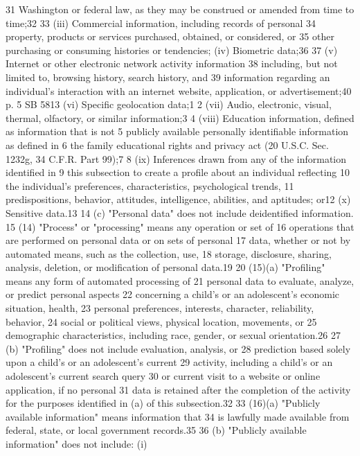 31 Washington or federal law, as they may be construed or amended from
time to time;32
33 (iii) Commercial information, including records of personal
34 property, products or services purchased, obtained, or considered, or
35 other purchasing or consuming histories or tendencies;
(iv) Biometric data;36
37 (v) Internet or other electronic network activity information
38 including, but not limited to, browsing history, search history, and
39 information regarding an individual's interaction with an internet
website, application, or advertisement;40
p. 5 SB 5813
(vi) Specific geolocation data;1
2 (vii) Audio, electronic, visual, thermal, olfactory, or similar
information;3
4 (viii) Education information, defined as information that is not
5 publicly available personally identifiable information as defined in
6 the family educational rights and privacy act (20 U.S.C. Sec. 1232g,
34 C.F.R. Part 99);7
8 (ix) Inferences drawn from any of the information identified in
9 this subsection to create a profile about an individual reflecting
10 the individual's preferences, characteristics, psychological trends,
11 predispositions, behavior, attitudes, intelligence, abilities, and
aptitudes; or12
(x) Sensitive data.13
14 (c) "Personal data" does not include deidentified information.
15 (14) "Process" or "processing" means any operation or set of
16 operations that are performed on personal data or on sets of personal
17 data, whether or not by automated means, such as the collection, use,
18 storage, disclosure, sharing, analysis, deletion, or modification of
personal data.19
20 (15)(a) "Profiling" means any form of automated processing of
21 personal data to evaluate, analyze, or predict personal aspects
22 concerning a child's or an adolescent's economic situation, health,
23 personal preferences, interests, character, reliability, behavior,
24 social or political views, physical location, movements, or
25 demographic characteristics, including race, gender, or sexual
orientation.26
27 (b) "Profiling" does not include evaluation, analysis, or
28 prediction based solely upon a child's or an adolescent's current
29 activity, including a child's or an adolescent's current search query
30 or current visit to a website or online application, if no personal
31 data is retained after the completion of the activity for the
purposes identified in (a) of this subsection.32
33 (16)(a) "Publicly available information" means information that
34 is lawfully made available from federal, state, or local government
records.35
36 (b) "Publicly available information" does not include: (i)
